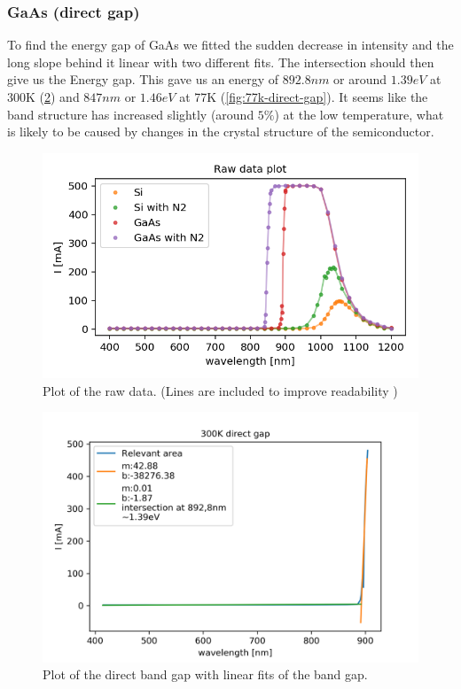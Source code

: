\documentclass[]{article}
\begin{document}
\subsubsection{GaAs (direct gap)}
To find the energy gap of GaAs we fitted the sudden decrease in intensity and the long slope behind it linear with two different fits. The intersection should then give us the Energy gap. This gave us an energy of $892.8nm$ or around $1.39eV$ at 300K (\ref{fig:300k-direct-gap}) and $847nm$ or $1.46eV$ at 77K (\ref{fig:77k-direct-gap}). It seems like the band structure has increased slightly (around $5\%$) at the low temperature, what is likely to be caused by changes in the crystal structure of the semiconductor. 
\begin{figure}
	\centering
	\includegraphics[width=0.9\linewidth]{"Plots/raw data"}
	\caption{Plot of the raw data. (Lines are included to improve readability )}
	\label{fig:raw-data}
\end{figure}
\begin{figure}
	\centering
	\includegraphics[width=0.7\linewidth]{"Plots/300k direct gap"}
	\caption{Plot of the direct band gap with linear fits of the band gap.}
	\label{fig:300k-direct-gap}
\end{figure}
\end{document}
